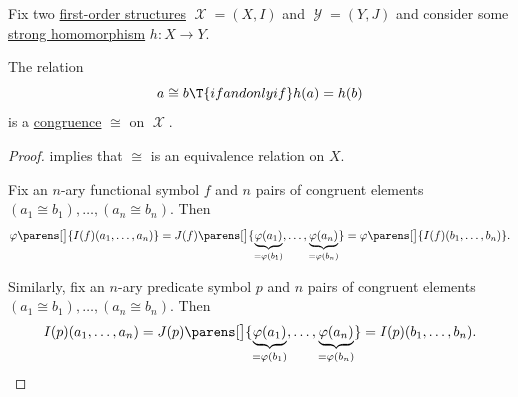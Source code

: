 \begin{proposition}\label{thm:fol_homomorphism_induces_congruence}
  Fix two \hyperref[def:fol_structure]{first-order structures} \( \mscrX = (X, I) \) and \( \mscrY = (Y, J) \) and consider some \hyperref[def:fol_homomorphism]{strong homomorphism} \( h: X \to Y \).

  The relation
  \begin{equation}\label{eq:thm:fol_homomorphism_induces_congruence}
    a \cong b \T{if and only if} h(a) = h(b)
  \end{equation}
  is a \hyperref[def:fol_congruence]{congruence} \( {\cong} \) on \( \mscrX \).
\end{proposition}
\begin{proof}
   implies that \( {\cong} \) is an equivalence relation on \( X \).

   Fix an \( n \)-ary functional symbol \( f \) and \( n \) pairs of congruent elements \( (a_1 \cong b_1), \ldots, (a_n \cong b_n) \). Then
  \begin{equation*}
    \varphi\parens[\big]{ I(f)(a_1, \ldots, a_n) }
    =
    J(f)\parens[\big]{ \underbrace{\varphi(a_1)}_{=\varphi(b_1)}, \ldots, \underbrace{\varphi(a_n)}_{=\varphi(b_n)} }
    =
    \varphi\parens[\big]{ I(f)(b_1, \ldots, b_n) }.
  \end{equation*}

   Similarly, fix an \( n \)-ary predicate symbol \( p \) and \( n \) pairs of congruent elements \( (a_1 \cong b_1), \ldots, (a_n \cong b_n) \). Then
  \begin{equation*}
    I(p)(a_1, \ldots, a_n)
    =
    J(p)\parens[\big]{ \underbrace{\varphi(a_1)}_{=\varphi(b_1)}, \ldots, \underbrace{\varphi(a_n)}_{=\varphi(b_n)} }
    =
    I(p)(b_1, \ldots, b_n).
  \end{equation*}
\end{proof}

